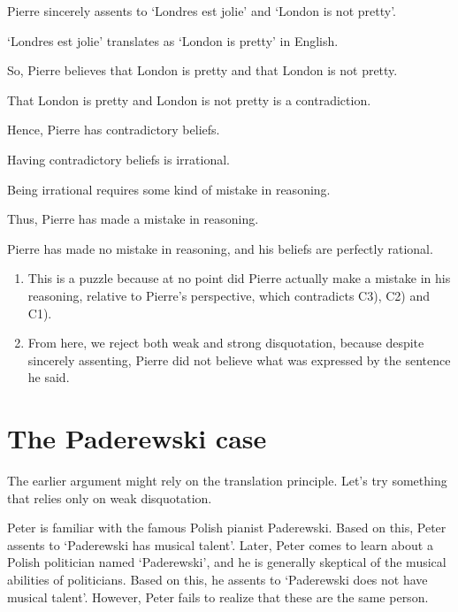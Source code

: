 \begin{argument}\leavevmode
\begin{premises}
  \item[(P1)] Pierre sincerely assents to `Londres est jolie' and `London is not pretty'.
  \item[(P2)] `Londres est jolie' translates as `London is pretty' in English.
  \item[(C1)] So, Pierre believes that London is pretty and that London is not pretty.
  \item[(P3)] That London is pretty and London is not pretty is a contradiction.
  \item[(C2)] Hence, Pierre has contradictory beliefs.
  \item[(P4)] Having contradictory beliefs is irrational.
  \item[(P5)] Being irrational requires some kind of mistake in reasoning.
  \item[(C3)] Thus, Pierre has made a mistake in reasoning.
  \item[(P6)] Pierre has made no mistake in reasoning, and his beliefs are perfectly rational.
\end{premises}
\end{argument}

\begin{enumerate}
  \item This is a puzzle because at no point did Pierre actually make a mistake in his reasoning, relative to Pierre's perspective, which contradicts C3), C2) and C1).
  \item From here, we reject both weak and strong disquotation, because despite sincerely assenting, Pierre did not believe what was expressed by the sentence he said.
\end{enumerate}

\section{The Paderewski case}

The earlier argument might rely on the translation principle. Let's try something that relies only on weak disquotation.

\begin{example}
Peter is familiar with the famous Polish pianist Paderewski. Based on this, Peter assents to `Paderewski has musical talent'. Later, Peter comes to learn about a Polish politician named `Paderewski', and he is generally skeptical of the musical abilities of politicians. Based on this, he assents to `Paderewski does not have musical talent'. However, Peter fails to realize that these are the same person.
\end{example}

